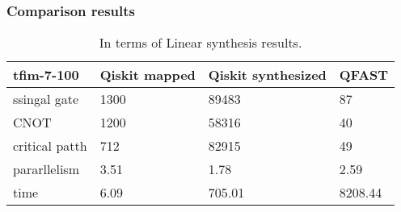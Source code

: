 \begin{frame}
  \frametitle{Comparison results}

  \begin{table}[]
    \begin{tabular}{l|lll}
    tfim-7-100  & Qiskit mapped & Qiskit synthesized & QFAST  \\\hline
    ssingal gate    & 1300          & 89483              & 87      \\
    CNOT           & 1200          & 58316              & 40      \\
    critical patth & 712           & 82915              & 49      \\
    pararllelism   & 3.51          & 1.78               & 2.59    \\
    time           & 6.09          & 705.01             & 8208.44
    \end{tabular}
    \caption{In terms of Linear synthesis results.}
    \end{table}
\end{frame}

